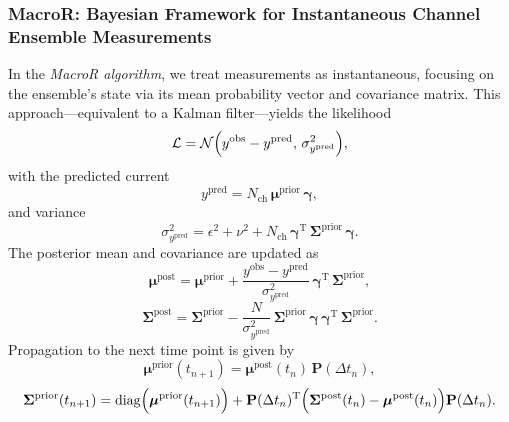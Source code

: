 \documentclass[9pt]{elife}
\begin{document}
	\subsubsection{MacroR: Bayesian Framework for Instantaneous Channel Ensemble Measurements}
	
	In the \textit{MacroR algorithm}, we treat measurements as instantaneous, focusing on the ensemble's state via its mean probability vector and covariance matrix. This approach—equivalent to a Kalman filter\cite{stepanyuk2011efficient}—yields the likelihood
	\begin{equation}
		\mathcal{L} = \mathcal{N}\Bigl( y^{\text{obs}} - y^{\text{pred}},\, \sigma^2_{y^{\text{pred}}} \Bigr),
		\label{eq:macro_likelihood}
	\end{equation}
	with the predicted current
	\begin{equation}
		y^{\text{pred}} = N_{\text{ch}}\, \boldsymbol{\mu}^{\text{prior}}\, \boldsymbol{\gamma},
		\label{eq:macro_predicted_y}
	\end{equation}
	and variance
	\begin{equation}
		\sigma^2_{y^{\text{pred}}} = \epsilon^2 + \nu^2+ N_{\text{ch}}\, \boldsymbol{\gamma}^{\mathrm{T}}\, \boldsymbol{\Sigma}^{\text{prior}}\, \boldsymbol{\gamma}.
		\label{eq:macro_sigma_pred}
	\end{equation}
	The posterior mean and covariance are updated as
	\begin{equation}
		\boldsymbol{\mu}^{\text{post}} = \boldsymbol{\mu}^{\text{prior}} + \frac{y^{\text{obs}} - y^{\text{pred}}}{\sigma^2_{y^{\text{pred}}}}\, \boldsymbol{\gamma}^{\mathrm{T}}\, \boldsymbol{\Sigma}^{\text{prior}},
		\label{eq:macro_mean_posterior}
	\end{equation}
	\begin{equation}
		\boldsymbol{\Sigma}^{\text{post}} = \boldsymbol{\Sigma}^{\text{prior}} - \frac{N}{\sigma^2_{y^{\text{pred}}}}\, \boldsymbol{\Sigma}^{\text{prior}}\, \boldsymbol{\gamma}\, \boldsymbol{\gamma}^{\mathrm{T}}\, \boldsymbol{\Sigma}^{\text{prior}}.
		\label{eq:macro_cov_posterior}
	\end{equation}
	Propagation to the next time point is given by
	\begin{equation}
		\boldsymbol{\mu}^{\text{prior}}(t_{n+1}) = \boldsymbol{\mu}^{\text{post}}(t_n)\, \mathbf{P}(\Delta t_n),
		\label{eq:macro_mean_next_prior}
	\end{equation}
	\begin{equation}
		\boldsymbol{\Sigma}^{\text{prior}}(t_{n+1}) = \mathrm{diag}\Bigl(\boldsymbol{\mu}^{\text{prior}}(t_{n+1})\Bigr) + \mathbf{P}(\Delta t_n)^{\mathrm{T}} \Bigl( \boldsymbol{\Sigma}^{\text{post}}(t_n) - \boldsymbol{\mu}^{\text{post}}(t_n) \Bigr) \mathbf{P}(\Delta t_n).
		\label{eq:macro_mean_next_cov}
	\end{equation}
\end{document}
